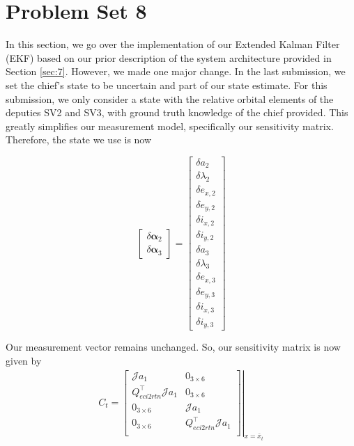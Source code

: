 \section{Problem Set 8}

In this section, we go over the implementation of our Extended Kalman Filter (EKF) based on our prior description of the system architecture provided in Section \ref{sec:7}. However, we made one major change. In the last submission, we set the chief's state to be uncertain and part of our state estimate. For this submission, we only consider a state with the relative orbital elements of the deputies SV2 and SV3, with ground truth knowledge of the chief provided. This greatly simplifies our measurement model, specifically our sensitivity matrix. Therefore, the state we use is now

\begin{equation}
\begin{bmatrix}
\delta \boldsymbol{\alpha}_2 \\
\hline
\delta \boldsymbol{\alpha}_3
\end{bmatrix}
=
\begin{bmatrix}
\delta a_2 \\
\delta \lambda_2 \\
\delta e_{x,2} \\
\delta e_{y,2} \\
\delta i_{x,2} \\
\delta i_{y,2} \\
\hline
\delta a_3 \\
\delta \lambda_3 \\
\delta e_{x,3} \\
\delta e_{y,3} \\
\delta i_{x,3} \\
\delta i_{y,3}
\end{bmatrix}
\end{equation}

Our measurement vector remains unchanged. So, our sensitivity matrix is now given by
\begin{align}
    C_t = \left.\begin{bmatrix}
        \mathcal{J}a_1 & 0_{3\times6} \\
         Q^\top_{eci2rtn} \mathcal{J}
a_1 & 0_{3\times6} \\
        0_{3\times6}  & \mathcal{J}a_1 \\
        0_{3\times6} & Q^\top_{eci2rtn} \mathcal{J}
a_1\\
    \end{bmatrix} \right|_{x = \bar{x}_t}
\end{align}

